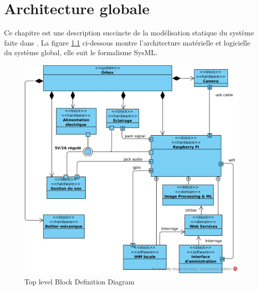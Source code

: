 
\chapter{Architecture globale}

Ce chapitre est une description succincte de la modélisation statique du système faite dans \cite{OBCdS}.
La figure \ref{TopBDD} ci-dessous montre l'architecture matérielle et logicielle du système global, elle suit le formalisme SysML.

\begin{figure}[H]
	\centerline{
		\includegraphics[scale=0.75,fbox]{img/SysML_Top_BDD.png}
	}
	\caption{Top level Block Definition Diagram}
	\label{TopBDD}
\end{figure}

